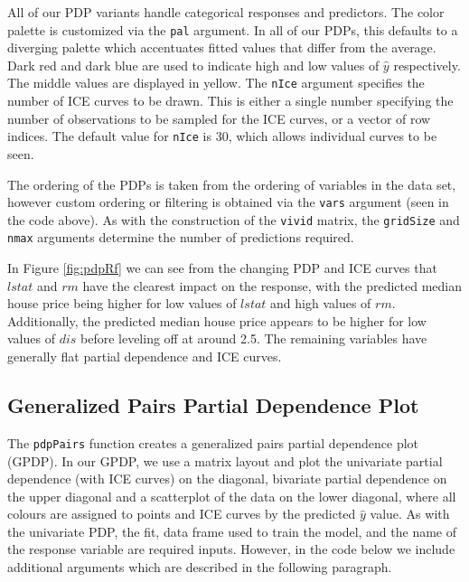 All of our PDP variants handle categorical responses and predictors. The color palette is customized via the \texttt{pal} argument. In all of our PDPs, this defaults to a diverging palette which accentuates fitted values that differ from the average. Dark red and dark blue are used to indicate high and low values of \(\hat{y}\) respectively. The middle values are displayed in yellow. The \texttt{nIce} argument specifies the number of ICE curves to be drawn. This is either a single number specifying the number of observations to be sampled for the ICE curves, or a vector of row indices. The default value for \texttt{nIce} is 30, which allows individual curves to be seen.

The ordering of the PDPs is taken from the ordering of variables in the data set, however custom ordering or filtering is obtained via the \texttt{vars} argument (seen in the code above). As with the construction of the \texttt{vivid} matrix, the \texttt{gridSize} and \texttt{nmax} arguments determine the number of predictions required.

In Figure \ref{fig:pdpRf} we can see from the changing PDP and ICE curves that \(lstat\) and \(rm\) have the clearest impact on the response, with the predicted median house price being higher for low values of \(lstat\) and high values of \(rm\). Additionally, the predicted median house price appears to be higher for low values of \(dis\) before leveling off at around 2.5. The remaining variables have generally flat partial dependence and ICE curves.

\hypertarget{generalized-pairs-partial-dependence-plot}{%
\subsection{Generalized Pairs Partial Dependence Plot}\label{generalized-pairs-partial-dependence-plot}}

The \texttt{pdpPairs} function creates a generalized pairs partial dependence plot (GPDP). In our GPDP, we use a matrix layout and plot the univariate partial dependence (with ICE curves) on the diagonal, bivariate partial dependence on the upper diagonal and a scatterplot of the data on the lower diagonal, where all colours are assigned to points and ICE curves by the predicted \(\hat{y}\) value. As with the univariate PDP, the fit, data frame used to train the model, and the name of the response variable are required inputs. However, in the code below we include additional arguments which are described in the following paragraph.

